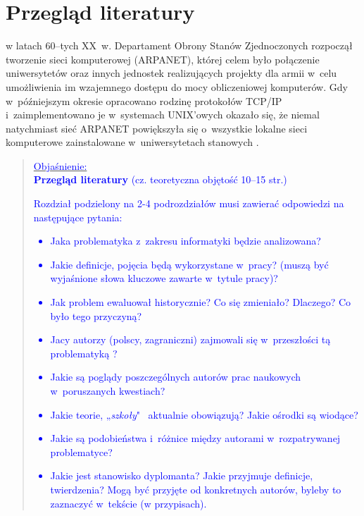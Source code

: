 \chapter{Przegląd literatury}

w latach 60--tych XX~w. Departament Obrony Stanów Zjednoczonych rozpoczął tworzenie sieci komputerowej (ARPANET), której celem było połączenie uniwersytetów oraz innych jednostek realizujących projekty dla armii w~celu umożliwienia im wzajemnego dostępu do mocy obliczeniowej komputerów. Gdy w~późniejszym okresie opracowano rodzinę protokołów TCP/IP i~zaimplementowano je w~systemach UNIX’owych okazało się, że niemal natychmiast sieć ARPANET powiększyła się o~wszystkie lokalne sieci komputerowe zainstalowane w~uniwersytetach stanowych \cite{ss3,ss4,ss5}.

\lipsum[1-1]

\begin{quote}
\scriptsize{
\underline{\textcolor{blue}{Objaśnienie:}}\\[1mm]
\textcolor{blue}{\textbf{Przegląd literatury} (cz. teoretyczna objętość 10--15 str.)}\\[1mm]
\textcolor{blue}{
Rozdział podzielony na 2-4 podrozdziałów musi zawierać odpowiedzi na następujące pytania:
\begin{itemize}
\item  Jaka problematyka z~zakresu informatyki będzie analizowana?
\item  Jakie definicje, pojęcia będą wykorzystane w~pracy? (muszą być wyjaśnione słowa kluczowe zawarte w~tytule pracy)?
\item  Jak problem ewaluował historycznie? Co się zmieniało? Dlaczego? Co było tego przyczyną?
\item  Jacy autorzy (polscy, zagraniczni) zajmowali się w~przeszłości tą problematyką ?
\item  Jakie są poglądy poszczególnych autorów prac naukowych w~poruszanych kwestiach?
\item  Jakie teorie, „\emph{szkoły}" ~aktualnie obowiązują? Jakie ośrodki są wiodące?
\item  Jakie są podobieństwa i~różnice między autorami w~rozpatrywanej problematyce?
\item  Jakie jest stanowisko dyplomanta? Jakie przyjmuje definicje, twierdzenia? Mogą być przyjęte od konkretnych autorów, byleby to zaznaczyć w~tekście (w przypisach).
\end{itemize} }}
\end{quote}

